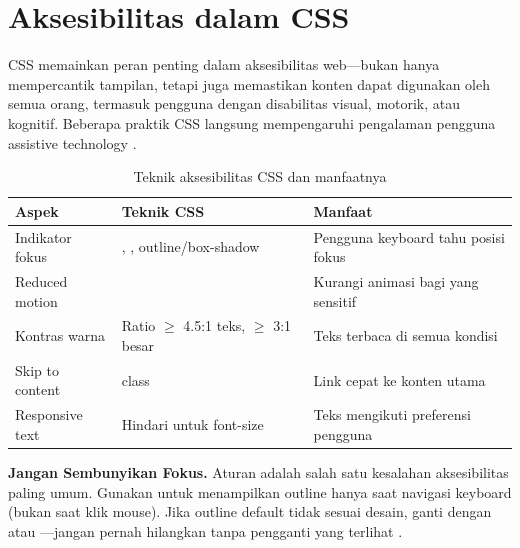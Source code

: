 ﻿\section{Aksesibilitas dalam CSS}

CSS memainkan peran penting dalam aksesibilitas web---bukan hanya mempercantik tampilan, tetapi juga memastikan konten dapat digunakan oleh semua orang, termasuk pengguna dengan disabilitas visual, motorik, atau kognitif. Beberapa praktik CSS langsung mempengaruhi pengalaman pengguna assistive technology \cite{mdnAccessibility}.

\begin{table}[H]
\centering
\small
\begin{tabular}{|P{3.3cm}|P{2.85cm}|P{3.45cm}|}
\hline
\textbf{Aspek} & \textbf{Teknik CSS} & \textbf{Manfaat} \\
\hline
Indikator fokus & , , outline/box-shadow & Pengguna keyboard tahu posisi fokus \\
\hline
Reduced motion & \parbox[t]{2.4cm}{\raggedright{}\linebreak[0]} & Kurangi animasi bagi yang sensitif \\
\hline
Kontras warna & Ratio $\geq$ 4.5:1 teks, $\geq$ 3:1 besar & Teks terbaca di semua kondisi \\
\hline
Skip to content &  class & Link cepat ke konten utama \\
\hline
Responsive text & Hindari  untuk font-size & Teks mengikuti preferensi pengguna \\
\hline
\end{tabular}
\caption{Teknik aksesibilitas CSS dan manfaatnya}
\end{table}


\begin{konsep}
\textbf{Jangan Sembunyikan Fokus.} Aturan  adalah salah satu kesalahan aksesibilitas paling umum. Gunakan  untuk menampilkan outline hanya saat navigasi keyboard (bukan saat klik mouse). Jika outline default tidak sesuai desain, ganti dengan  atau ---jangan pernah hilangkan tanpa pengganti yang terlihat \cite{webdevAccessibility}.
\end{konsep}

